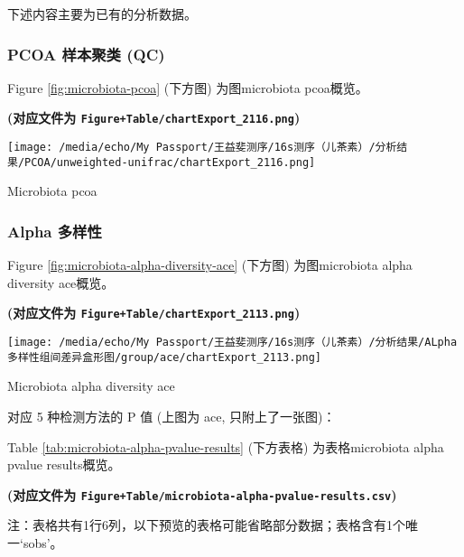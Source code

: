 \documentclass[
]{article}
\begin{document}
下述内容主要为已有的分析数据。

\hypertarget{pcoa-ux6837ux672cux805aux7c7b-qc}{%
\subsubsection{PCOA 样本聚类 (QC)}\label{pcoa-ux6837ux672cux805aux7c7b-qc}}

Figure \ref{fig:microbiota-pcoa} (下方图) 为图microbiota pcoa概览。

\textbf{(对应文件为 \texttt{Figure+Table/chartExport\_2116.png})}

\def\@captype{figure}
\begin{center}
\texttt{[image: /media/echo/My Passport/王益斐测序/16s测序（儿茶素）/分析结果/PCOA/unweighted-unifrac/chartExport\_2116.png]}
\caption{Microbiota pcoa}\label{fig:microbiota-pcoa}
\end{center}

\hypertarget{alpha-ux591aux6837ux6027}{%
\subsubsection{Alpha 多样性}\label{alpha-ux591aux6837ux6027}}

Figure \ref{fig:microbiota-alpha-diversity-ace} (下方图) 为图microbiota alpha diversity ace概览。

\textbf{(对应文件为 \texttt{Figure+Table/chartExport\_2113.png})}

\def\@captype{figure}
\begin{center}
\texttt{[image: /media/echo/My Passport/王益斐测序/16s测序（儿茶素）/分析结果/ALpha多样性组间差异盒形图/group/ace/chartExport\_2113.png]}
\caption{Microbiota alpha diversity ace}\label{fig:microbiota-alpha-diversity-ace}
\end{center}

对应 5 种检测方法的 P 值 (上图为 ace, 只附上了一张图)：

Table \ref{tab:microbiota-alpha-pvalue-results} (下方表格) 为表格microbiota alpha pvalue results概览。

\textbf{(对应文件为 \texttt{Figure+Table/microbiota-alpha-pvalue-results.csv})}

\begin{center}\begin{tcolorbox}[colback=gray!10, colframe=gray!50, width=0.9\linewidth, arc=1mm, boxrule=0.5pt]注：表格共有1行6列，以下预览的表格可能省略部分数据；表格含有1个唯一`sobs'。
\end{tcolorbox}
\end{center}
\end{document}
